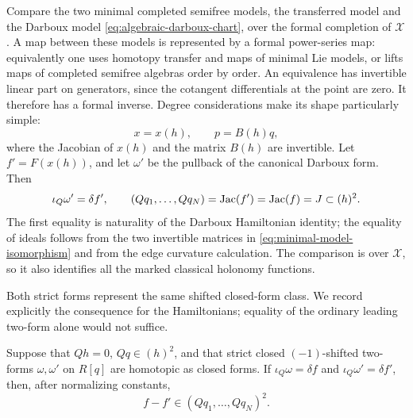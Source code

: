 Compare the two minimal completed semifree models, the transferred model
and the Darboux model \eqref{eq:algebraic-darboux-chart}, over the formal
completion of \(\mathcal X\).  A map between these models is represented
by a formal power-series map: equivalently one uses homotopy transfer
and maps of minimal Lie models, or lifts maps of completed semifree
algebras order by order.  An equivalence has invertible linear part on
generators, since the cotangent differentials at the point are zero.
It therefore has a formal inverse.  Degree considerations make its
shape particularly simple:
\begin{equation}
\label{eq:minimal-model-isomorphism}
                       x=x(h),\qquad p=B(h)q,
\end{equation}
where the Jacobian of \(x(h)\) and the matrix \(B(h)\) are invertible.
Let \(f'=F(x(h))\), and let \(\omega'\) be the pullback of the
canonical Darboux form.  Then
\[
 \iota_Q\omega'=\delta f',\qquad
 (Qq_1,\ldots,Qq_N)=\operatorname{Jac}(f')=\operatorname{Jac}(f)=J\subset(h)^2.
\]
The first equality is naturality of the Darboux Hamiltonian identity;
the equality of ideals follows from the two invertible matrices in
\eqref{eq:minimal-model-isomorphism} and from the edge curvature
calculation.  The comparison is over \(\mathcal X\), so it also
identifies all the marked classical holonomy functions.

Both strict forms represent the same shifted closed-form class.
We record explicitly the consequence for the Hamiltonians; equality
of the ordinary leading two-form alone would not suffice.

\begin{lemma}
\label{lem:cartan-jacobian-square}
Suppose that \(Qh=0\), \(Qq\in(h)^2\), and that strict closed
\((-1)\)-shifted two-forms \(\omega,\omega'\) on \(R[q]\) are
homotopic as closed forms.  If
\(\iota_Q\omega=\delta f\) and
\(\iota_Q\omega'=\delta f'\), then, after normalizing constants,
\[
                       f-f'\in(Qq_1,\ldots,Qq_N)^2.
\]
\end{lemma}

